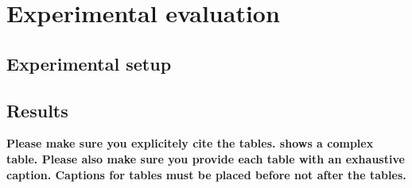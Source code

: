 \section{Experimental evaluation}

\subsection{Experimental setup}

\subsection{Results}
\textbf{Please make sure you explicitely cite the tables.
 shows a complex table.
Please also make sure you provide each table with an exhaustive caption.
Captions for tables must be placed before not after the tables.}



